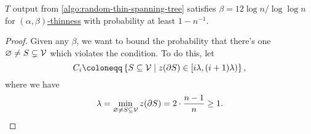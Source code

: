 \begin{lemma}\label{lma:lec12-2}
	\(T\) output from \autoref{algo:random-thin-spanning-tree} satisfies \(\beta = 12\log n / \log \log n\) for \hyperref[def:thin]{\((\alpha , \beta )\)-thinness} with probability at least \(1 - n^{-1} \).
\end{lemma}
\begin{proof}
	Given any \(\beta \), we want to bound the probability that there's one \(\varnothing \neq S \subsetneq \mathcal{\MakeUppercase{v}} \) which violates the condition. To do this, let
	\[
		C_i \coloneqq \left\{ S \subseteq \mathcal{\MakeUppercase{v}} \mid z(\partial S) \in [i \lambda , (i+1)\lambda ) \right\} ,
	\]
	where we have
	\[
		\lambda = \min _{\varnothing \neq S \subseteq \mathcal{\MakeUppercase{v}} }z(\partial S) = 2\cdot \frac{n-1}{n} \geq 1.
	\]


\end{proof}
